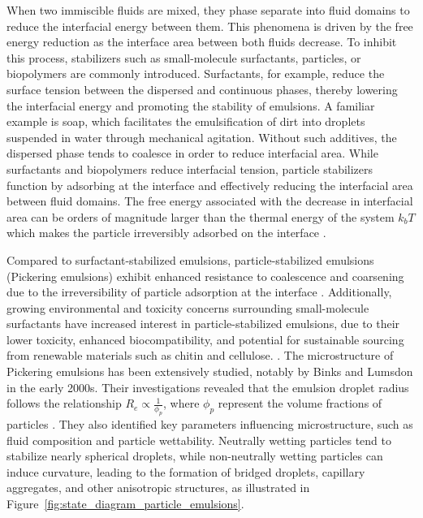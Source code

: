 When two immiscible fluids are mixed, they phase separate into fluid domains to reduce the interfacial energy between them. This phenomena is driven by the free energy
reduction as the interface area between both fluids decrease. To inhibit this process, stabilizers such as small-molecule surfactants, particles, or biopolymers are commonly introduced. 
Surfactants, for example, reduce the surface tension between the dispersed and continuous phases, thereby lowering the interfacial energy and promoting the stability of emulsions. 
A familiar example is soap, which facilitates the emulsification of dirt into droplets suspended in water through mechanical agitation.
Without such additives, the dispersed phase tends to coalesce in order to reduce interfacial area. While surfactants and biopolymers reduce interfacial tension, particle stabilizers 
function by adsorbing at the interface and effectively reducing the interfacial area between fluid domains. The free energy associated with the decrease in interfacial area 
can be orders of magnitude larger than the thermal energy of the system $k_b T$ which makes the particle irreversibly adsorbed on the interface \cite{ngai_particle-stabilized_2015}.

Compared to surfactant-stabilized emulsions, particle-stabilized emulsions (Pickering emulsions) exhibit enhanced resistance to coalescence and coarsening
due to the irreversibility of particle adsorption at the interface \cite{ngai_particle-stabilized_2015} .
Additionally, growing environmental and toxicity concerns surrounding small-molecule surfactants have increased interest in particle-stabilized emulsions, due to their lower toxicity, 
enhanced biocompatibility, and potential for sustainable sourcing from renewable materials such as chitin and cellulose.
\cite{kaczerewska_environmental_2020, lechuga_acute_2016, fujisawa_nanocellulose-stabilized_2017, tang_stimuli-responsive_2016, kalliola_carboxymethyl_2018}.
The microstructure of Pickering emulsions has been extensively studied, notably by Binks and Lumsdon in the early 2000s. Their investigations revealed that the emulsion droplet radius 
follows the relationship $R_e \propto \frac{1}{\phi_p}$, where $\phi_p$ represent the volume fractions of particles \cite{binks_pickering_2001}. 
They also identified key parameters influencing microstructure, such as fluid composition and particle wettability. Neutrally wetting particles tend to stabilize nearly spherical droplets, 
while non-neutrally wetting particles can induce curvature, leading to the formation of bridged droplets, capillary aggregates, and other anisotropic structures, as illustrated in 
Figure~\ref{fig:state_diagram_particle_emulsions}.

